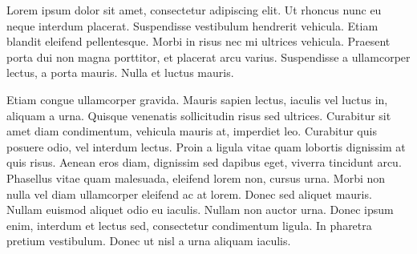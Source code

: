 Lorem ipsum dolor sit amet, consectetur adipiscing elit. Ut rhoncus nunc eu neque interdum placerat. Suspendisse vestibulum hendrerit vehicula. Etiam blandit eleifend pellentesque. Morbi in risus nec mi ultrices vehicula. Praesent porta dui non magna porttitor, et placerat arcu varius. Suspendisse a ullamcorper lectus, a porta mauris. Nulla et luctus mauris.

Etiam congue ullamcorper gravida. Mauris sapien lectus, iaculis vel luctus in, aliquam a urna. Quisque venenatis sollicitudin risus sed ultrices. Curabitur sit amet diam condimentum, vehicula mauris at, imperdiet leo. Curabitur quis posuere odio, vel interdum lectus. Proin a ligula vitae quam lobortis dignissim at quis risus. Aenean eros diam, dignissim sed dapibus eget, viverra tincidunt arcu. Phasellus vitae quam malesuada, eleifend lorem non, cursus urna. Morbi non nulla vel diam ullamcorper eleifend ac at lorem. Donec sed aliquet mauris. Nullam euismod aliquet odio eu iaculis. Nullam non auctor urna. Donec ipsum enim, interdum et lectus sed, consectetur condimentum ligula. In pharetra pretium vestibulum. Donec ut nisl a urna aliquam iaculis.
